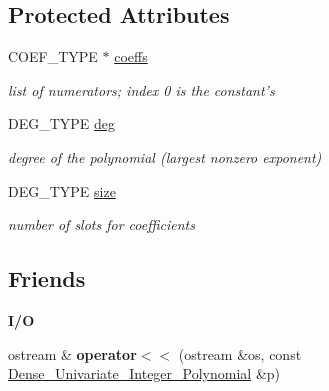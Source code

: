\subsection*{Protected Attributes}
\begin{DoxyCompactItemize}
\item 
\mbox{\label{class_dense___univariate___integer___polynomial_ac980954e486906d80d08f4155254d186}} 
C\+O\+E\+F\+\_\+\+T\+Y\+PE $\ast$ \hyperlink{class_dense___univariate___integer___polynomial_ac980954e486906d80d08f4155254d186}{coeffs}
\begin{DoxyCompactList}\small\item\em list of numerators; index 0 is the constant's \end{DoxyCompactList}\item 
\mbox{\label{class_dense___univariate___integer___polynomial_a2dc3d8ec3b25f3a17417883c890fbdce}} 
D\+E\+G\+\_\+\+T\+Y\+PE \hyperlink{class_dense___univariate___integer___polynomial_a2dc3d8ec3b25f3a17417883c890fbdce}{deg}
\begin{DoxyCompactList}\small\item\em degree of the polynomial (largest nonzero exponent) \end{DoxyCompactList}\item 
\mbox{\label{class_dense___univariate___integer___polynomial_a7691962e41ebc91eb18c270f0d11845a}} 
D\+E\+G\+\_\+\+T\+Y\+PE \hyperlink{class_dense___univariate___integer___polynomial_a7691962e41ebc91eb18c270f0d11845a}{size}
\begin{DoxyCompactList}\small\item\em number of slots for coefficients \end{DoxyCompactList}\end{DoxyCompactItemize}
\subsection*{Friends}
\begin{Indent}\textbf{ I/O}\par
\begin{DoxyCompactItemize}
\item 
\mbox{\label{class_dense___univariate___integer___polynomial_a73b460b2b57fc554551b92dfc818d45d}} 
ostream \& {\bfseries operator$<$$<$} (ostream \&os, const \hyperlink{class_dense___univariate___integer___polynomial}{Dense\+\_\+\+Univariate\+\_\+\+Integer\+\_\+\+Polynomial} \&p)
\end{DoxyCompactItemize}
\end{Indent}


